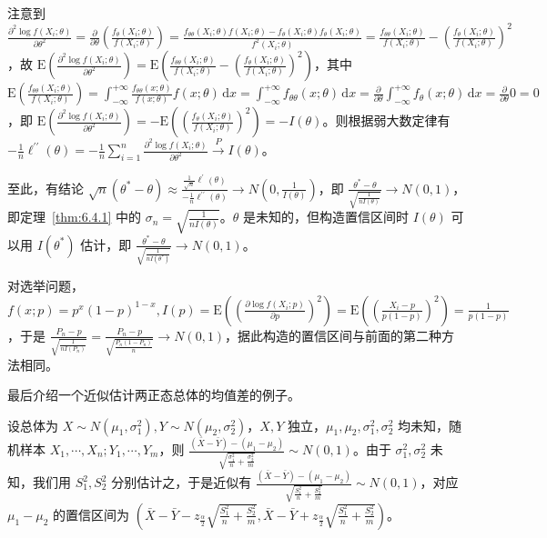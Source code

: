 \documentclass[../main.tex]{subfiles}
\begin{document}
注意到 $\frac{\partial^2\log f(X_i;\theta)}{\partial\theta^2}=\frac\partial{\partial\theta}\left(\frac{f_\theta(X_i;\theta)}{f(X_i;\theta)}\right)=\frac{f_{\theta\theta}(X_i;\theta)f(X_i;\theta)-f_\theta(X_i;\theta)f_\theta(X_i;\theta)}{f^2(X_i;\theta)}=\frac{f_{\theta\theta}(X_i;\theta)}{f(X_i;\theta)}-\left(\frac{f_\theta(X_i;\theta)}{f(X_i;\theta)}\right)^2$，故 $\mathrm E\left(\frac{\partial^2\log f(X_i;\theta)}{\partial\theta^2}\right)=\mathrm E\left(\frac{f_{\theta\theta}(X_i;\theta)}{f(X_i;\theta)}-\left(\frac{f_\theta(X_i;\theta)}{f(X_i;\theta)}\right)^2\right)$，其中 $\mathrm E(\frac{f_{\theta\theta}(X_i;\theta)}{f(X_i;\theta)})=\int_{-\infty}^{+\infty}\frac{f_{\theta\theta}(x;\theta)}{f(x;\theta)}f(x;\theta)\,\mathrm dx=\int_{-\infty}^{+\infty}f_{\theta\theta}(x;\theta)\,\mathrm dx=\frac{\partial}{\partial\theta}\int_{-\infty}^{+\infty}f_\theta(x;\theta)\,\mathrm dx=\frac{\partial}{\partial\theta}0=0$，即 $\mathrm E\left(\frac{\partial^2\log f(X_i;\theta)}{\partial\theta^2}\right)=-\mathrm E\left(\left(\frac{f_\theta(X_i;\theta)}{f(X_i;\theta)}\right)^2\right)=-I(\theta)$。则根据弱大数定律有 $-\frac1n\ell^{\prime\prime}(\theta)=-\frac1n\sum_{i=1}^n\frac{\partial^2\log f(X_i;\theta)}{\partial\theta^2}\overset{P}{\rightarrow}I(\theta)$。

至此，有结论 $\sqrt n(\theta^*-\theta)\approx\frac{\frac1{\sqrt n}\ell^\prime(\theta)}{-\frac1n\ell^{\prime\prime}(\theta)}\rightarrow N(0,\frac1{I(\theta)})$，即 $\frac{\theta^*-\theta}{\sqrt{\frac1{nI(\theta)}}}\rightarrow N(0,1)$，即定理~\ref{thm:6.4.1} 中的 $\sigma_n=\sqrt{\frac1{nI(\theta)}}$。$\theta$ 是未知的，但构造置信区间时 $I(\theta)$ 可以用 $I(\theta^*)$ 估计，即 $\frac{\theta^*-\theta}{\sqrt{\frac1{nI(\theta^*)}}}\rightarrow N(0,1)$。

对选举问题，$f(x;p)=p^x(1-p)^{1-x},I(p)=\mathrm E\left(\left(\frac{\partial\log f(X_i;p)}{\partial p}\right)^2\right)=\mathrm E\left(\left(\frac{X_i-p}{p(1-p)}\right)^2\right)=\frac1{p(1-p)}$，于是 $\frac{P_n-p}{\sqrt{\frac1{nI(P_n)}}}=\frac{P_n-p}{\sqrt{\frac{P_n(1-P_n)}n}}\rightarrow N(0,1)$，据此构造的置信区间与前面的第二种方法相同。

最后介绍一个近似估计两正态总体的均值差的例子。

\begin{example}
    设总体为 $X\sim N(\mu_1,\sigma_1^2),Y\sim N(\mu_2,\sigma_2^2)$，$X,Y$ 独立，$\mu_1,\mu_2,\sigma_1^2,\sigma_2^2$ 均未知，随机样本 $X_1,\cdots,X_n;Y_1,\cdots,Y_m$，则 $\frac{(\bar X-\bar Y)-(\mu_1-\mu_2)}{\sqrt{\frac{\sigma_1^2}n+\frac{\sigma_2^2}m}}\sim N(0,1)$。由于 $\sigma_1^2,\sigma_2^2$ 未知，我们用 $S_1^2,S_2^2$ 分别估计之，于是近似有 $\frac{(\bar X-\bar Y)-(\mu_1-\mu_2)}{\sqrt{\frac{S_1^2}n+\frac{S_2^2}m}}\sim N(0,1)$，对应 $\mu_1-\mu_2$ 的置信区间为 $(\bar X-\bar Y-z_{\frac\alpha2}\sqrt{\frac{S_1^2}n+\frac{S_2^2}m},\bar X-\bar Y+z_{\frac\alpha2}\sqrt{\frac{S_1^2}n+\frac{S_2^2}m})$。
\end{example}
\end{document}
